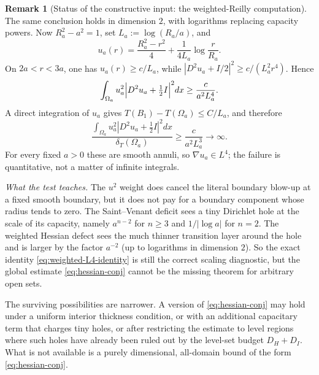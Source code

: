 \documentclass[11pt]{amsart}
\theoremstyle{definition}
\newtheorem{remark}[theorem]{Remark}
\newcommand{\Om}{\Omega}
\newcommand{\dT}{\delta_T}
\begin{document}
\begin{remark}[Status of the constructive input: the weighted-Reilly computation]
The same conclusion holds in dimension \(2\), with logarithms replacing
capacity powers.  Now \(R_a^2-a^2=1\), set \(L_a:=\log(R_a/a)\), and
\[
   u_a(r)=\frac{R_a^2-r^2}{4}+\frac{1}{4L_a}\log\frac r{R_a} .
\]
On \(2a<r<3a\), one has \(u_a(r)\ge c/L_a\), while
\(|D^2u_a+I/2|^2\ge c/(L_a^2 r^4)\).  Hence
\[
   \int_{\Om_a}u_a^2\Bigl|D^2u_a+\tfrac12 I\Bigr|^2dx
   \ge \frac{c}{a^2L_a^4} .
\]
A direct integration of \(u_a\) gives \(T(B_1)-T(\Om_a)\le C/L_a\), and therefore
\[
   \frac{\displaystyle\int_{\Om_a}u_a^2|D^2u_a+\tfrac12 I|^2dx}
        {\dT(\Om_a)}
   \ge \frac{c}{a^2L_a^3}\longrightarrow\infty .
\]
For every fixed \(a>0\) these are smooth annuli, so \(\nabla u_a\in L^4\); the
failure is quantitative, not a matter of infinite integrals.

\emph{What the test teaches.}
The \(u^2\) weight does cancel the literal boundary blow-up at a fixed smooth
boundary, but it does not pay for a boundary component whose radius tends to
zero.  The Saint--Venant deficit sees a tiny Dirichlet hole at the scale of its
capacity, namely \(a^{n-2}\) for \(n\ge3\) and \(1/|\log a|\) for \(n=2\).  The
weighted Hessian defect sees the much thinner transition layer around the hole
and is larger by the factor \(a^{-2}\) (up to logarithms in dimension \(2\)).
So the exact identity \eqref{eq:weighted-L4-identity} is still the correct
scaling diagnostic, but the global estimate \eqref{eq:hessian-conj} cannot be
the missing theorem for arbitrary open sets.

The surviving possibilities are narrower.  A version of \eqref{eq:hessian-conj}
may hold under a uniform interior thickness condition, or with an additional
capacitary term that charges tiny holes, or after restricting the estimate to
level regions where such holes have already been ruled out by the level-set
budget \(D_H+D_I\).  What is not available is a purely dimensional, all-domain
bound of the form \eqref{eq:hessian-conj}.


\end{remark}
\end{document}
